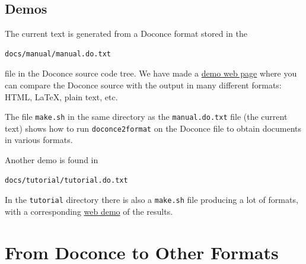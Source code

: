 \documentclass{article}
\begin{document}
% 
% 
% 
% 
% 
% 

\subsection{Demos}


The current text is generated from a Doconce format stored in the
\begin{Verbatim}[fontsize=\fontsize{9pt}{9pt},tabsize=8,baselinestretch=0.85,
fontfamily=tt,xleftmargin=7mm]
docs/manual/manual.do.txt
\end{Verbatim}
\noindent
file in the Doconce source code tree. We have made a 
\href{https://doconce.googlecode.com/hg/trunk/docs/demos/manual/index.html}{demo web page}
where you can compare the Doconce source with the output in many
different formats: HTML, {\LaTeX}, plain text, etc.

The file {\fontsize{10pt}{10pt}\verb!make.sh!} in the same directory as the {\fontsize{10pt}{10pt}\verb!manual.do.txt!} file
(the current text) shows how to run {\fontsize{10pt}{10pt}\verb!doconce2format!} on the
Doconce file to obtain documents in various formats.

Another demo is found in
\begin{Verbatim}[fontsize=\fontsize{9pt}{9pt},tabsize=8,baselinestretch=0.85,
fontfamily=tt,xleftmargin=7mm]
docs/tutorial/tutorial.do.txt
\end{Verbatim}
\noindent
In the {\fontsize{10pt}{10pt}\verb!tutorial!} directory there is also a {\fontsize{10pt}{10pt}\verb!make.sh!} file producing a
lot of formats, with a corresponding
\href{https://doconce.googlecode.com/hg/trunk/docs/demos/tutorial/index.html}{web demo}
of the results.



\section{From Doconce to Other Formats}
\end{document}
